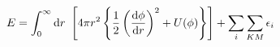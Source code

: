 \begin{equation}
E=\int_{0}^{\infty}{\rm d}r~
	\left[ 4\pi r^2\left\{
		\frac{1}{2}\left( \frac{{\rm d}\phi}{{\rm d}r} \right)^2 
		+U(\phi) \right\}\right]
	+\sum_i\sum_{KM}\epsilon_i
\label{E.eqn2}
\end{equation}

